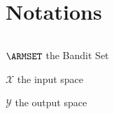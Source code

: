 
\chapter*{Notations}
$\ \ $

$\ARMSET$ the Bandit Set

$\mathscr{X}$ the input space

$\mathscr{Y}$ the output space


\clearpage
